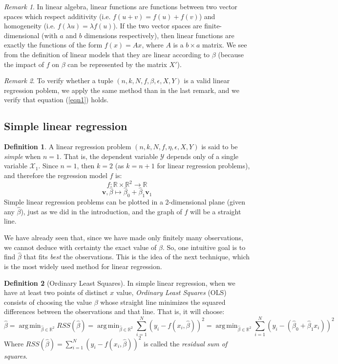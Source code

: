 \documentclass{article}
\theoremstyle{definition}
\newtheorem{definition}{Definition}[section]
\theoremstyle{remark}
\newtheorem*{remark}{Remark}
\theoremstyle{example}
\DeclareMathOperator*{\argmin}{arg\,min}
\newcommand{\vv}{\mathbf{v}}
\newcommand{\betat}{\hat{\beta}}
\begin{document}
\begin{remark}
		In linear algebra, linear functions are functions between two vector spaces which respect additivity (i.e. $f(u + v) = f(u) + f(v)$) and homogeneity (i.e. $f(\lambda u) = \lambda f(u)$). If the two vector spaces are finite-dimensional (with $a$ and $b$ dimensions respectively), then linear functions are exactly the functions of the form $f(x) = Ax$, where $A$ is a $b \times a$ matrix. We see from the definition of linear models that they are linear according to $\beta$ (because the impact of $f$ on $\beta$ can be represented by the matrix $X'$).
\end{remark}

\begin{remark}
		To verify whether a tuple $(n, k, N, f, \beta, \epsilon, X, Y)$ is a valid linear regression poblem, we apply the same method than in the last remark, and we verify that equation (\ref{eqn1}) holds.
\end{remark}

\subsection{Simple linear regression}

\begin{definition}
		A linear regression problem $(n, k, N, f, \eta, \epsilon, X, Y)$ is said to be \textit{simple} when $n=1$. That is, the dependent variable $\mathcal{Y}$ depends only of a single variable $\mathcal{X}_1$. Since $n=1$, then $k=2$ (as $k=n+1$ for linear regression problems), and therefore the regression model $f$ is:
				$$f : \mathbb{R} \times \mathbb{R}^2 \rightarrow \mathbb{R}$$
				$$\vv, \betat \mapsto \betat_0 + \betat_1 \vv_1$$
		Simple linear regression problems can be plotted in a 2-dimensional plane (given any $\betat$), just as we did in the introduction, and the graph of $f$ will be a straight line.
\end{definition}

We have already seen that, since we have made only finitely many observations, we cannot deduce with certainty the exact value of $\beta$. So, one intuitive goal is to find $\betat$ that fits \textit{best} the observations. This is the idea of the next technique, which is the most widely used method for linear regression.

\begin{definition}[Ordinary Least Squares]
		In simple linear regression, when we have at least two points of distinct $x$ value, \textit{Ordinary Least Squares} (OLS) consists of choosing the value $\beta$ whose straight line minimizes the squared differences between the observations and that line. That is, it will choose:
				$$\betat = \argmin_{\betat \in \mathbb{R}^2} RSS(\betat) = \argmin_{\betat \in \mathbb{R}^2} \sum_{i=1}^N (y_i - f(x_i, \betat))^2 = \argmin_{\betat \in \mathbb{R}^2} \sum_{i=1}^N (y_i - (\betat_0 + \betat_1 x_i))^2$$
		Where $RSS(\betat) = \sum_{i=1}^N (y_i - f(x_i, \betat))^2$ is called the \textit{residual sum of squares}.
\end{definition}
\end{document}
